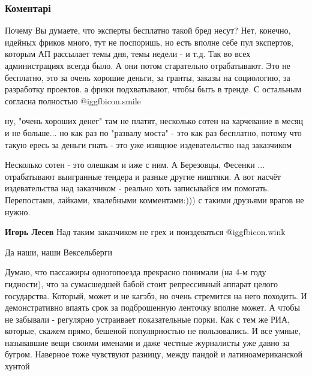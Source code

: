  
 
 
 
 
\subsubsection{Коментарі}

\begin{itemize} %

Почему Вы думаете, что эксперты бесплатно такой бред несут? Нет, конечно,
идейных фриков много, тут не поспоришь, но есть вполне себе пул экспертов,
которым АП рассылает темы дня, темы недели - и т.д. Так во всех администрациях
всегда было. А они потом старательно отрабатывают. Это не бесплатно, это за
очень хорошие деньги, за гранты, заказы на социологию, за разработку проектов.
а фрики подхватывают, чтобы быть в тренде. С остальным согласна полностью  @igg{fbicon.smile} 

\begin{itemize} %

ну, "очень хороших денег" там не платят, несколько сотен на харчевание в месяц
и не больше... но как раз по "развалу моста" - это как раз бесплатно, потому
что такую ересь за деньги гнать - это уже изящное издевательство над заказчиком


Несколько сотен - это олешкам и иже с ним. А Березовцы, Фесенки ...
отрабатывают выигранные тендера и разные другие ништяки. А вот насчёт
издевательства над заказчиком - реально хоть записывайся им помогать.
Перепостами, лайками, хвалебными комментами:))) с такими друзьями врагов не
нужно.

\textbf{Игорь Лесев} Над таким заказчиком не грех и поиздеваться  @igg{fbicon.wink} 
\end{itemize} %

Да наши, наши Вексельберги


Думаю, что пассажиры одногопоезда прекрасно понимали (на 4-м году гидности),
что за сумасшедшей бабой стоит репрессивный аппарат целого государства.
Который, может и не кагэбэ, но очень стремится на него походить. И
демонстративно впаять срок за подброшенную ленточку вполне может. А чтобы не
забывали - регулярно устраивает показательные порки. Как с тем же РИА, которые,
скажем прямо, бешеной популярностью не пользовались. И все умные, называвшие
вещи своими именами и даже честные журналисты уже давно за бугром. Наверное
тоже чувствуют разницу, между пандой и латиноамериканской хунтой


\end{itemize}
